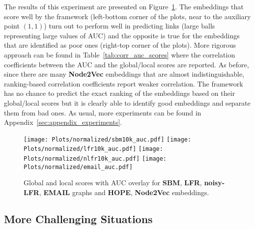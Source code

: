 \documentclass[11pt]{article}
\begin{document}
The results of this experiment are presented on Figure~\ref{fig:normalizedlinkpred}. The embeddings that score well by the framework (left-bottom corner of the plots, near to the auxiliary point $(1,1)$) turn out to perform well in predicting links (large balls representing large values of AUC) and the opposite is true for the embeddings that are identified as poor ones (right-top corner of the plots). More rigorous approach can be found in Table~\ref{tab:corr_auc_scores} where the correlation coefficients between the AUC and the global/local scores are reported. As before, since there are many \textbf{Node2Vec} embeddings that are almost indistinguishable, ranking-based correlation coefficients report weaker correlation. The framework has no chance to predict the exact ranking of the embeddings based on their global/local scores but it is clearly able to identify good embeddings and separate them from bad ones. As usual, more experiments can be found in Appendix~\ref{sec:appendix_experiments}.

\begin{figure}[h!]
    \centering
    \texttt{[image: Plots/normalized/sbm10k\_auc.pdf]}
        \hspace{.1cm}
    \texttt{[image: Plots/normalized/lfr10k\_auc.pdf]}
    \vspace{.1cm}
    \texttt{[image: Plots/normalized/nlfr10k\_auc.pdf]}
        \hspace{.1cm}
    \texttt{[image: Plots/normalized/email\_auc.pdf]}
        \hspace{.1cm}
    \caption{Global and local scores with AUC overlay for \textbf{SBM}, \textbf{LFR}, \textbf{noisy-LFR}, \textbf{EMAIL} graphs and \textbf{HOPE}, \textbf{Node2Vec} embeddings.}
    \label{fig:normalizedlinkpred}
\end{figure}

\subsection{More Challenging Situations}\label{sec:experiments7}
\end{document}

